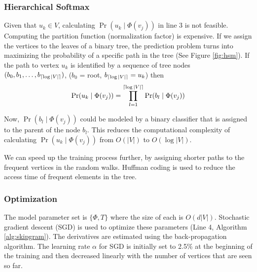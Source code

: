 \documentclass{sig-alternate}
\DeclarePairedDelimiter{\ceil}{\lceil}{\rceil}
\newcommand{\todo}[1]{{\small\color{red}{\bf #1}}}
\newcommand{\comment}[1]{}
\begin{document}
\subsubsection{Hierarchical Softmax}
\label{sec:hsm}
Given that $u_k \in V$, calculating $\Pr(u_k \mid \Phi(v_j))$ in line 3 is not feasible.
Computing the partition function (normalization factor) is expensive.
If we assign the vertices to the leaves of a binary tree, the prediction problem turns into maximizing the probability of a specific path in the tree (See Figure \ref{fig:hsm}).
If the path to vertex $u_k$ is identified by a sequence of tree nodes $(b_0, b_1, \dots, b_{\ceil{\log|V|}})$, ($b_0$ = root, $b_{\ceil{\log|V|}} = u_k$) then $$\Pr(u_k \mid \Phi(v_j)) = \prod_{l=1}^{\ceil{\log|V|}} \Pr(b_l \mid \Phi(v_j)) $$

Now, $\Pr(b_l \mid \Phi(v_j))$ could be modeled by a binary classifier that is assigned to the parent of the node $b_l$.
This reduces the computational complexity of calculating $\Pr(u_k \mid \Phi(v_j))$ from $O(|V|)$ to $O(\log |V|)$.

We can speed up the training process further, by assigning shorter paths to the frequent vertices in the random walks.
Huffman coding is used to reduce the access time of frequent elements in the tree.

\subsubsection{Optimization}
The model parameter set is $\{\Phi, T\}$ where the size of each is $O(d|V|)$.
Stochastic gradient descent (SGD) \cite{sgd} is used to optimize these parameters (Line 4, Algorithm \ref{alg:skipgram}).
The derivatives are estimated using the back-propagation algorithm.
The learning rate $\alpha$ for SGD is initially set to 2.5\% at the beginning of the training and then decreased linearly with the number of vertices that are seen so far.


\comment{
\subsection{Complexity}
\todo{I want to show performance vs L for blogcatalog, I want to say that we converge quickly, we can reduce the size of walks in future work.}

The total length of the walks is $L = \gamma t$, then complexity of our approach is $O(dwL\log |V|)$.
Figure \ref{} shows the relation between the quality of the embeddings and length of the walks seen so far in the training.
While our model build representations that are quite useful at early stages.
The complexity of the graph structure plays a main role in how much fast we can build a good estimate of the graph topology.
As the number of possible transitions in all our walks is bounded by the number of edges $m$, we can bound our complexity to be $O(dwm\log |V|)$.
The choice of $w$ in free scale networks is bounded by the network diameter, as there is decreasing amount of information in the collocations that span the whole graph.
As $w$ is bounded by  a constant, we can see that our complexity is $O(dm\log |V|)$
}
\end{document}
